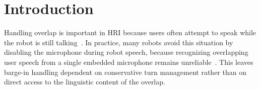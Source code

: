 \documentclass[manuscript,screen,review]{acmart}
\begin{document}

\maketitle
\fancyhf{}
\renewcommand{\headrulewidth}{0pt}
\fancyfoot[C]{\thepage}
\pagestyle{fancy}

\section{Introduction}
\label{section:1}


Handling overlap is important in HRI because users often attempt to speak while the robot is still talking~\cite{gervits2018pardon,skantze2021turn}. In practice, many robots avoid this situation by disabling the microphone during robot speech, because recognizing overlapping user speech from a single embedded microphone remains unreliable~\cite{Li_2024}. This leaves barge-in handling dependent on conservative turn management rather than on direct access to the linguistic content of the overlap.
\end{document}
